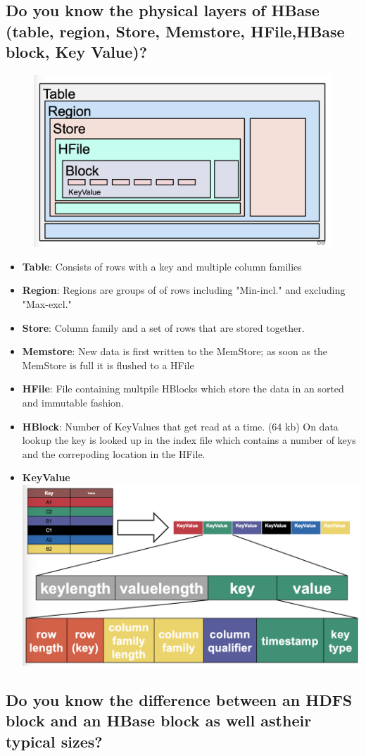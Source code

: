 \documentclass{article}
\begin{document}
\subsection{Do you know the physical layers of HBase (table, region, Store, Memstore, HFile,HBase block, Key Value)?}

\begin{figure}
    \centering
    \includegraphics[width=0.5\linewidth]{img/ondisk_hbase.png}
\end{figure}

\begin{itemize}
    \item \textbf{Table}: Consists of rows with a key and multiple column families
    \item \textbf{Region}: {Regions are groups of of rows including "Min-incl." and excluding "Max-excl."}
    \item \textbf{Store}: Column family and a set of rows that are stored together. 
    \item \textbf{Memstore}: New data is first written to the MemStore; as soon as the MemStore is full it is flushed to a HFile
    \item \textbf{HFile}: File containing multpile HBlocks which store the data in an sorted and immutable fashion. 
    \item \textbf{HBlock}: Number of KeyValues that get read at a time. (64 kb) On data lookup the key is looked up in the index file which contains a number of keys and the correpoding location in the HFile.
    \item \textbf{KeyValue}
        \includegraphics[width=0.5\linewidth]{img/hfile_keyvalue.png}
\end{itemize}

\subsection{Do you know the difference between an HDFS block and an HBase block as well astheir typical sizes?}
\end{document}
